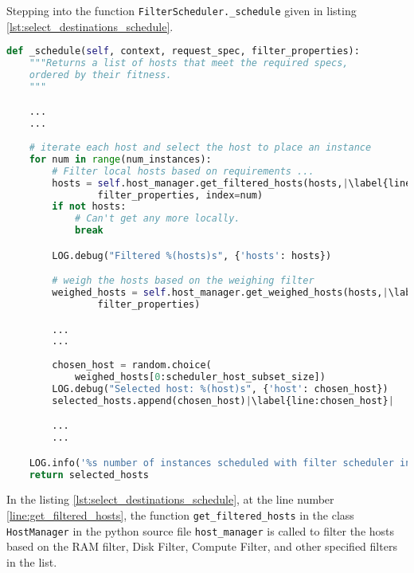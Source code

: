 Stepping into the function \verb|FilterScheduler._schedule| given in listing \ref{lst:select_destinations_schedule}.
\newline
\begin{lstlisting}[frame=single, language=Python, caption={The function \_schedule}, label={lst:select_destinations_schedule}, escapechar=|]
def _schedule(self, context, request_spec, filter_properties):
	"""Returns a list of hosts that meet the required specs,
	ordered by their fitness.
	"""

	...
	...
	
	# iterate each host and select the host to place an instance
	for num in range(num_instances):
		# Filter local hosts based on requirements ...
		hosts = self.host_manager.get_filtered_hosts(hosts,|\label{line:get_filtered_hosts}|
				filter_properties, index=num)
		if not hosts:
			# Can't get any more locally.
			break

		LOG.debug("Filtered %(hosts)s", {'hosts': hosts})

		# weigh the hosts based on the weighing filter
		weighed_hosts = self.host_manager.get_weighed_hosts(hosts,|\label{line:get_weighed_hosts}|
				filter_properties)

		...
		...
		
		chosen_host = random.choice(
			weighed_hosts[0:scheduler_host_subset_size])
		LOG.debug("Selected host: %(host)s", {'host': chosen_host})
		selected_hosts.append(chosen_host)|\label{line:chosen_host}|

		...
		...

	LOG.info('%s number of instances scheduled with filter scheduler in %s seconds' % (num_instances, (rtime.time() - start_time)))
	return selected_hosts
\end{lstlisting}


In the listing \ref{lst:select_destinations_schedule}, at the line number \ref{line:get_filtered_hosts}, the function \verb|get_filtered_hosts| in the class \verb|HostManager| in the python source file \verb|host_manager| is called to filter the hosts based on the RAM filter, Disk Filter, Compute Filter, and other specified filters in the list.

